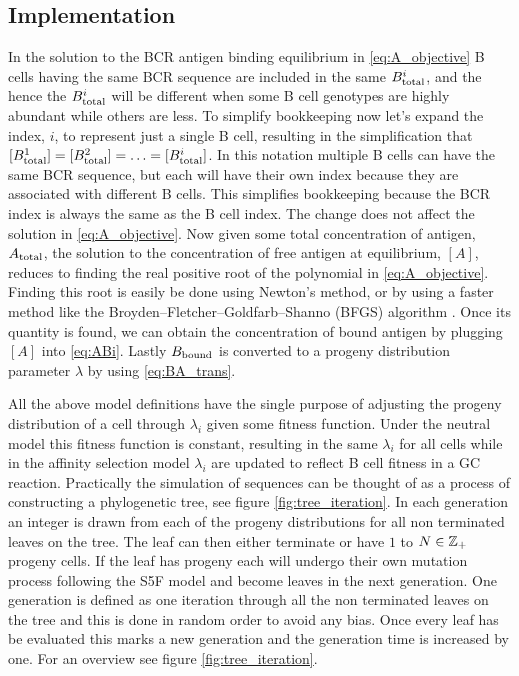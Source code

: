 \subsection{Implementation}
In the solution to the BCR antigen binding equilibrium in \eqref{eq:A_objective} B cells having the same BCR sequence are included in the same $B^i_{\text{total}}$, and the hence the $B^i_{\text{total}}$ will be different when some B cell genotypes are highly abundant while others are less.
To simplify bookkeeping now let's expand the index, $i$, to represent just a single B cell, resulting in the simplification that $[B^1_{\text{total}}] = [B^2_{\text{total}}] = \ldots = [B^i_{\text{total}}]$.
In this notation multiple B cells can have the same BCR sequence, but each will have their own index because they are associated with different B cells.
This simplifies bookkeeping because the BCR index is always the same as the B cell index.
The change does not affect the solution in \eqref{eq:A_objective}.
Now given some total concentration of antigen, $A_{\text{total}}$, the solution to the concentration of free antigen at equilibrium, $[A]$, reduces to finding the real positive root of the polynomial in \eqref{eq:A_objective}.
Finding this root is easily be done using Newton's method, or by using a faster method like the Broyden–Fletcher–Goldfarb–Shanno (BFGS) algorithm \cite{shanno1985broyden}.
Once its quantity is found, we can obtain the concentration of bound antigen by plugging $[A]$ into \eqref{eq:ABi}.
Lastly $B_{\text{bound}}$ is converted to a progeny distribution parameter $\lambda$ by using \eqref{eq:BA_trans}.

All the above model definitions have the single purpose of adjusting the progeny distribution of a cell through $\lambda_i$ given some fitness function.
Under the neutral model this fitness function is constant, resulting in the same $\lambda_i$ for all cells while in the affinity selection model $\lambda_i$ are updated to reflect B cell fitness in a GC reaction.
Practically the simulation of sequences can be thought of as a process of constructing a phylogenetic tree, see figure \ref{fig:tree_iteration}.
In each generation an integer is drawn from each of the progeny distributions for all non terminated leaves on the tree.
The leaf can then either terminate or have $1$ to $N \in \mathbb{Z}_+$ progeny cells.
If the leaf has progeny each will undergo their own mutation process following the S5F model and become leaves in the next generation.
One generation is defined as one iteration through all the non terminated leaves on the tree and this is done in random order to avoid any bias.
Once every leaf has be evaluated this marks a new generation and the generation time is increased by one.
For an overview see figure \ref{fig:tree_iteration}.

